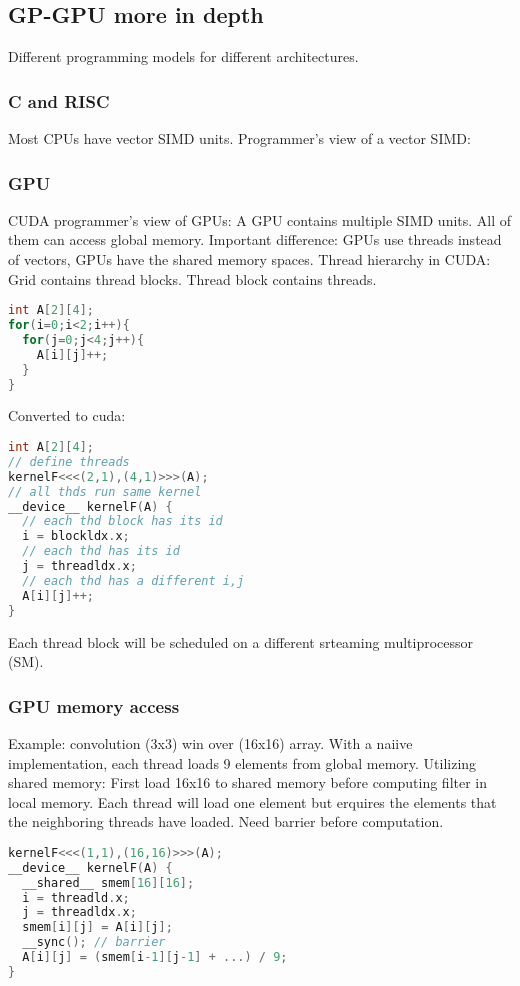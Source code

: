 \documentclass[a4paper, fontsize=8pt, landscape, DIV=1]{scrartcl}
\begin{document}
\begin{multicols*}{4}
  \subsection{GP-GPU more in depth}
  Different programming models for different architectures.
  
  \subsubsection{C and RISC}
  Most CPUs have vector SIMD units. Programmer's view of a vector SIMD:
  
  \subsubsection{GPU}
  CUDA programmer's view of GPUs: A GPU contains multiple SIMD units. All of them
  can access global memory. Important difference: GPUs use threads instead of vectors, 
  GPUs have the shared memory spaces.
  Thread hierarchy in CUDA: Grid contains thread blocks. Thread block contains threads.
\begin{lstlisting}[language=C]
int A[2][4];
for(i=0;i<2;i++){
  for(j=0;j<4;j++){
    A[i][j]++;
  }
}\end{lstlisting}
Converted to cuda:
\begin{lstlisting}[language=C]
int A[2][4];
// define threads
kernelF<<<(2,1),(4,1)>>>(A); 
// all thds run same kernel
__device__ kernelF(A) {
  // each thd block has its id
  i = blockldx.x;
  // each thd has its id
  j = threadldx.x;
  // each thd has a different i,j
  A[i][j]++;
}\end{lstlisting}
  Each thread block will be scheduled on a different srteaming multiprocessor (SM).

  \subsubsection{GPU memory access}
  Example: convolution (3x3) win over (16x16) array.
  With a naiive implementation, each thread loads 9 elements
  from global memory. Utilizing shared memory: First load 16x16 to shared memory before
  computing filter in local memory. Each thread will load one element but erquires the 
  elements that the neighboring threads have loaded. Need barrier before computation.
\begin{lstlisting}[language=C]
kernelF<<<(1,1),(16,16)>>>(A); 
__device__ kernelF(A) {
  __shared__ smem[16][16];
  i = threadld.x;
  j = threadldx.x;
  smem[i][j] = A[i][j];
  __sync(); // barrier
  A[i][j] = (smem[i-1][j-1] + ...) / 9;
}\end{lstlisting}


\end{multicols*}
\end{document}
